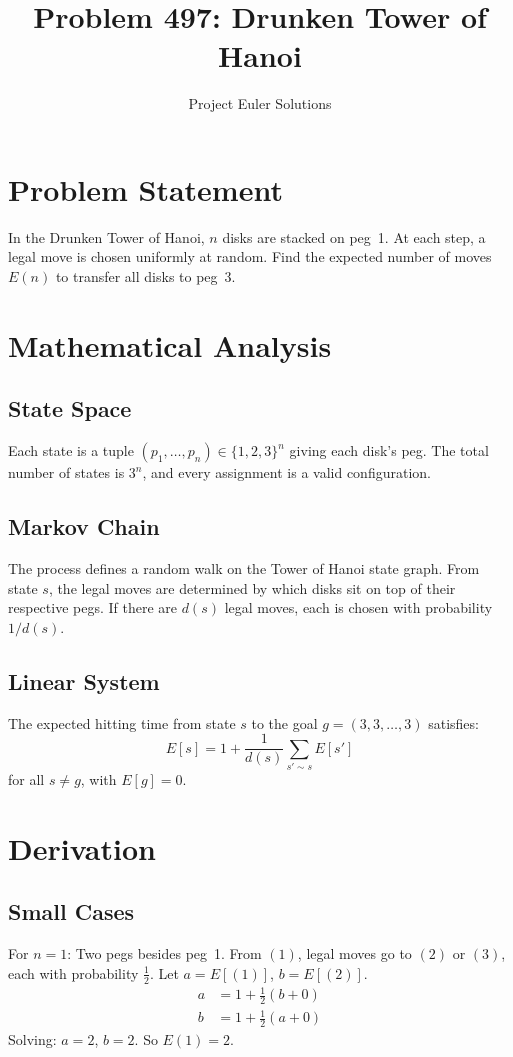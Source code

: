 \documentclass[11pt]{article}
\title{Problem 497: Drunken Tower of Hanoi}
\author{Project Euler Solutions}
\date{}
\begin{document}
\maketitle

\section{Problem Statement}
In the Drunken Tower of Hanoi, $n$ disks are stacked on peg~1. At each step, a legal move is chosen uniformly at random. Find the expected number of moves $E(n)$ to transfer all disks to peg~3.

\section{Mathematical Analysis}

\subsection{State Space}
Each state is a tuple $(p_1, \ldots, p_n) \in \{1,2,3\}^n$ giving each disk's peg. The total number of states is $3^n$, and every assignment is a valid configuration.

\subsection{Markov Chain}
The process defines a random walk on the Tower of Hanoi state graph. From state $s$, the legal moves are determined by which disks sit on top of their respective pegs. If there are $d(s)$ legal moves, each is chosen with probability $1/d(s)$.

\subsection{Linear System}
The expected hitting time from state $s$ to the goal $g = (3,3,\ldots,3)$ satisfies:
\[
E[s] = 1 + \frac{1}{d(s)} \sum_{s' \sim s} E[s']
\]
for all $s \ne g$, with $E[g] = 0$.

\section{Derivation}

\subsection{Small Cases}
For $n = 1$: Two pegs besides peg~1. From $(1)$, legal moves go to $(2)$ or $(3)$, each with probability $\frac{1}{2}$. Let $a = E[(1)]$, $b = E[(2)]$.
\begin{align}
a &= 1 + \tfrac{1}{2}(b + 0) \\
b &= 1 + \tfrac{1}{2}(a + 0)
\end{align}
Solving: $a = 2$, $b = 2$. So $E(1) = 2$.
\end{document}
